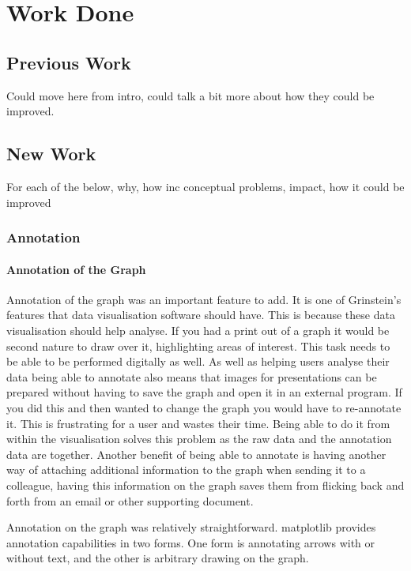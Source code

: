\section{Work Done}

\subsection{Previous Work}
Could move here from intro, could talk a bit more about how they could be improved.

\subsection{New Work}

For each of the below, why, how inc conceptual problems, impact, how it could be improved

\subsubsection{Annotation}

\paragraph{Annotation of the Graph}

Annotation of the graph was an important feature to add.  It is one of Grinstein's features that data visualisation software should have.  This is because these data visualisation should help analyse.  If you had a print out of a graph it would be second nature to draw over it, highlighting areas of interest.  This task needs to be able to be performed digitally as well.  As well as helping users analyse their data being able to annotate also means that images for presentations can be prepared without having to save the graph and open it in an external program.  If you did this and then wanted to change the graph you would have to re-annotate it.  This is frustrating for a user and wastes their time.  Being able to do it from within the visualisation solves this problem as the raw data and the annotation data are together.  Another benefit of being able to annotate is having another way of attaching additional information to the graph when sending it to a colleague, having this information on the graph saves them from flicking back and forth from an email or other supporting document.

Annotation on the graph was relatively straightforward.  matplotlib provides annotation capabilities in two forms.  One form is annotating arrows with or without text, and the other is arbitrary drawing on the graph.

